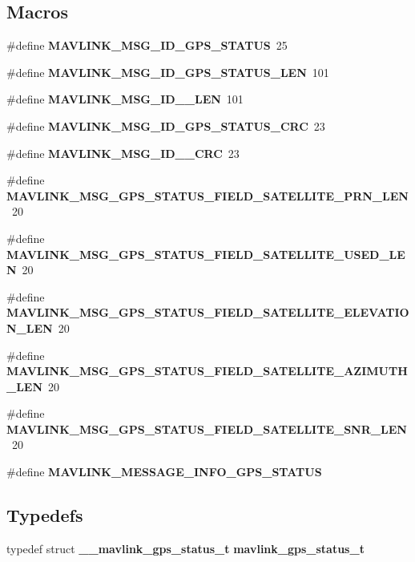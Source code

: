 \subsection*{Macros}
\begin{DoxyCompactItemize}
\item 
\#define \textbf{ M\+A\+V\+L\+I\+N\+K\+\_\+\+M\+S\+G\+\_\+\+I\+D\+\_\+\+G\+P\+S\+\_\+\+S\+T\+A\+T\+US}~25
\item 
\#define \textbf{ M\+A\+V\+L\+I\+N\+K\+\_\+\+M\+S\+G\+\_\+\+I\+D\+\_\+\+G\+P\+S\+\_\+\+S\+T\+A\+T\+U\+S\+\_\+\+L\+EN}~101
\item 
\#define \textbf{ M\+A\+V\+L\+I\+N\+K\+\_\+\+M\+S\+G\+\_\+\+I\+D\+\_\+\_\+\+L\+EN}~101
\item 
\#define \textbf{ M\+A\+V\+L\+I\+N\+K\+\_\+\+M\+S\+G\+\_\+\+I\+D\+\_\+\+G\+P\+S\+\_\+\+S\+T\+A\+T\+U\+S\+\_\+\+C\+RC}~23
\item 
\#define \textbf{ M\+A\+V\+L\+I\+N\+K\+\_\+\+M\+S\+G\+\_\+\+I\+D\+\_\+\_\+\+C\+RC}~23
\item 
\#define \textbf{ M\+A\+V\+L\+I\+N\+K\+\_\+\+M\+S\+G\+\_\+\+G\+P\+S\+\_\+\+S\+T\+A\+T\+U\+S\+\_\+\+F\+I\+E\+L\+D\+\_\+\+S\+A\+T\+E\+L\+L\+I\+T\+E\+\_\+\+P\+R\+N\+\_\+\+L\+EN}~20
\item 
\#define \textbf{ M\+A\+V\+L\+I\+N\+K\+\_\+\+M\+S\+G\+\_\+\+G\+P\+S\+\_\+\+S\+T\+A\+T\+U\+S\+\_\+\+F\+I\+E\+L\+D\+\_\+\+S\+A\+T\+E\+L\+L\+I\+T\+E\+\_\+\+U\+S\+E\+D\+\_\+\+L\+EN}~20
\item 
\#define \textbf{ M\+A\+V\+L\+I\+N\+K\+\_\+\+M\+S\+G\+\_\+\+G\+P\+S\+\_\+\+S\+T\+A\+T\+U\+S\+\_\+\+F\+I\+E\+L\+D\+\_\+\+S\+A\+T\+E\+L\+L\+I\+T\+E\+\_\+\+E\+L\+E\+V\+A\+T\+I\+O\+N\+\_\+\+L\+EN}~20
\item 
\#define \textbf{ M\+A\+V\+L\+I\+N\+K\+\_\+\+M\+S\+G\+\_\+\+G\+P\+S\+\_\+\+S\+T\+A\+T\+U\+S\+\_\+\+F\+I\+E\+L\+D\+\_\+\+S\+A\+T\+E\+L\+L\+I\+T\+E\+\_\+\+A\+Z\+I\+M\+U\+T\+H\+\_\+\+L\+EN}~20
\item 
\#define \textbf{ M\+A\+V\+L\+I\+N\+K\+\_\+\+M\+S\+G\+\_\+\+G\+P\+S\+\_\+\+S\+T\+A\+T\+U\+S\+\_\+\+F\+I\+E\+L\+D\+\_\+\+S\+A\+T\+E\+L\+L\+I\+T\+E\+\_\+\+S\+N\+R\+\_\+\+L\+EN}~20
\item 
\#define \textbf{ M\+A\+V\+L\+I\+N\+K\+\_\+\+M\+E\+S\+S\+A\+G\+E\+\_\+\+I\+N\+F\+O\+\_\+\+G\+P\+S\+\_\+\+S\+T\+A\+T\+US}
\end{DoxyCompactItemize}
\subsection*{Typedefs}
\begin{DoxyCompactItemize}
\item 
typedef struct \textbf{ \+\_\+\+\_\+mavlink\+\_\+gps\+\_\+status\+\_\+t} \textbf{ mavlink\+\_\+gps\+\_\+status\+\_\+t}
\end{DoxyCompactItemize}


